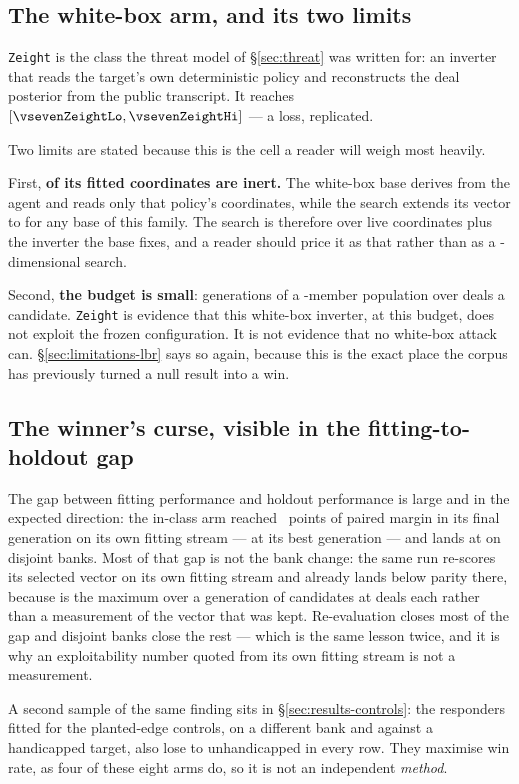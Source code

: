 \subsection{The white-box arm, and its two limits}
\label{sec:exploit-whitebox}

\texttt{Zeight} is the class the threat model of \S\ref{sec:threat} was written for: an inverter that
reads the target's own deterministic policy and reconstructs the deal posterior from the public
transcript. It reaches \vsevenZeightEdge{} $[\vsevenZeightLo, \vsevenZeightHi]$ --- a loss, replicated.

Two limits are stated because this is the cell a reader will weigh most heavily.

First, \textbf{\vsevenZeightInert{} of its fitted coordinates are inert.} The white-box base derives from the
\vsix{} agent and reads only that policy's \vsevenVsixCoords{} coordinates, while the search extends its
vector to \vsevenCoordinates{} for any base of this family. The search is therefore over \vsevenZeightLive{}
live coordinates plus the inverter the base fixes, and a reader should price it as that rather than as
a \vsevenCoordinates{}-dimensional search.

Second, \textbf{the budget is small}: \vsevenBfourGens{} generations of a
\vsevenBfourPop{}-member population over \vsevenBfourDeals{} deals a candidate. \texttt{Zeight}
is evidence that this white-box inverter, at this budget, does not exploit the frozen configuration.
It is not evidence that no white-box attack can. \S\ref{sec:limitations-lbr} says so again, because
this is the exact place the corpus has previously turned a null result into a win.

\subsection{The winner's curse, visible in the fitting-to-holdout gap}
\label{sec:exploit-curse}

The gap between fitting performance and holdout performance is large and in the expected direction:
the in-class arm reached \vsevenZoneFitMargin{}~points of paired margin in its final generation on
its own fitting stream --- \vsevenZoneFitPeak{} at its best generation --- and lands at
\vsevenZoneEdge{} on disjoint banks. Most of that gap is not the bank change: the same run re-scores its selected vector on its own
fitting stream and already lands below parity there, because \vsevenZoneFitMargin{} is the maximum
over a generation of candidates at \vsevenBfourDeals{} deals each rather than a measurement of the
vector that was kept. Re-evaluation closes most of the gap and disjoint banks close the rest ---
which is the same lesson twice, and it is why an exploitability number quoted from its own fitting
stream is not a measurement.

A second sample of the same finding sits in \S\ref{sec:results-controls}: the responders fitted for
the planted-edge controls, on a different bank and against a handicapped target, also lose to
unhandicapped \frozen{} in every row. They maximise win rate, as four of these eight arms do, so it
is not an independent \emph{method}.
